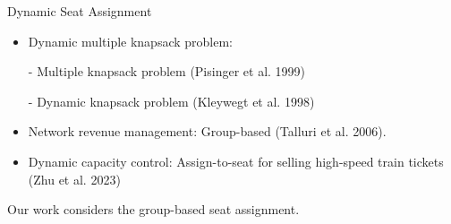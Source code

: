       \begin{frame}{Dynamic Seat Assignment}
        \begin{itemize}
          \item {\color{red}Dynamic multiple} knapsack problem:
                
          \item[-] Multiple knapsack problem (Pisinger et al. 1999)
          
          \item[-] Dynamic knapsack problem (Kleywegt et al. 1998)


          \vspace*{0.3cm}


          \item Network revenue management: {\color{red} Group-based} (Talluri et al. 2006).

          \vspace*{0.5cm}
          \item Dynamic capacity control: {\color{red} Assign-to-seat} for selling high-speed train
          tickets (Zhu et al. 2023)
        \end{itemize}

        \vspace*{0.4cm}

        \qquad Our work considers the group-based seat assignment.
      \end{frame}